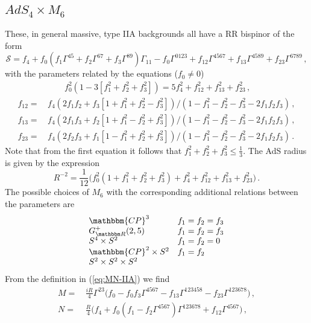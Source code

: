 \documentclass[a4paper,11pt]{article}
\begin{document}
\subsection{$AdS_4\times M_6$}
These, in general massive, type IIA backgrounds all have a RR bispinor of the form \cite{Wulff:2017zbl}
\begin{equation}
\mathcal S=f_4+f_0(f_1\Gamma^{45}+f_2\Gamma^{67}+f_3\Gamma^{89})\Gamma_{11}-f_0\Gamma^{0123}+f_{12}\Gamma^{4567}+f_{13}\Gamma^{4589}+f_{23}\Gamma^{6789}\,,
\end{equation}
with the parameters related by the equations ($f_0\neq0$)
\begin{align}
&\qquad f_0^2(1-3[f_1^2+f_2^2+f_3^2])=5f_4^2+f_{12}^2+f_{13}^2+f_{23}^2\,,\nonumber\\
f_{12}=\,&f_4(2f_1f_2+f_3[1+f_1^2+f_2^2-f_3^2])/(1-f_1^2-f_2^2-f_3^2-2f_1f_2f_3)\,,\label{eq:f-rel}\\
f_{13}=\,&f_4(2f_1f_3+f_2[1+f_1^2-f_2^2+f_3^2])/(1-f_1^2-f_2^2-f_3^2-2f_1f_2f_3)\,,\nonumber\\
f_{23}=\,&f_4(2f_2f_3+f_1[1-f_1^2+f_2^2+f_3^2])/(1-f_1^2-f_2^2-f_3^2-2f_1f_2f_3)\,.\nonumber
\end{align}
Note that from the first equation it follows that $f_1^2+f_2^2+f_3^2\leq\frac13$. The AdS radius is given by the expression
\begin{equation}
R^{-2}=\frac{1}{12}\big(f_0^2(1+f_1^2+f_2^2+f_3^2)+f_4^2+f_{12}^2+f_{13}^2+f_{23}^2\big)\,.
\label{eq:Rminus2}
\end{equation}
The possible choices of $M_6$ with the corresponding additional relations between the parameters are
\begin{equation}
\begin{array}{ll}
\mathbbm{CP}^3 & f_1=f_2=f_3\\
G_{\mathbbm R}^+(2,5) & f_1=f_2=f_3\\
S^4\times S^2 & f_1=f_2=0\\
\mathbbm{CP}^2\times S^2 & f_1=f_2\\
S^2\times S^2\times S^2 & \\
\end{array}
\label{eq:M6}
\end{equation}
From the definition in (\ref{eq:MN-IIA}) we find
\begin{align}
M=\,&\frac{iR}{4}\Gamma^{23}\big(f_0-f_0f_3\Gamma^{4567}-f_{13}\Gamma^{123458}-f_{23}\Gamma^{123678}\big)\,,\nonumber\\
N=\,&\frac{R}{4}\big(f_4+f_0(f_1-f_2\Gamma^{4567})\Gamma^{123678}+f_{12}\Gamma^{4567}\big)\,,
\end{align}
\end{document}
